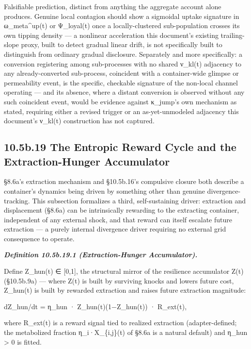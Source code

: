 \documentclass[
]{article}
\begin{document}
Falsifiable prediction, distinct from anything the aggregate account
alone produces. Genuine local contagion should show a sigmoidal uptake
signature in ω\_meta\^{}up(t) or Ψ\_loyal(t) once a locally-clustered
sub-population crosses its own tipping density --- a nonlinear
acceleration this document's existing trailing-slope proxy, built to
detect gradual linear drift, is not specifically built to distinguish
from ordinary gradual disclosure. Separately and more specifically: a
conversion registering among sub-processes with no shared ν\_kl(t)
adjacency to any already-converted sub-process, coincident with a
container-wide glimpse or permeability event, is the specific, checkable
signature of the non-local channel operating --- and its absence, where
a distant conversion is observed without any such coincident event,
would be evidence against κ\_jump's own mechanism as stated, requiring
either a revised trigger or an as-yet-unmodeled adjacency this
document's ν\_kl(t) construction has not captured.

\hypertarget{b.19-the-entropic-reward-cycle-and-the-extraction-hunger-accumulator}{%
\subsection{10.5b.19 The Entropic Reward Cycle and the Extraction-Hunger
Accumulator}\label{b.19-the-entropic-reward-cycle-and-the-extraction-hunger-accumulator}}

§8.6a's extraction mechanism and §10.5b.16's compulsive closure both
describe a container's dynamics being driven by something other than
genuine divergence-tracking. This subsection formalizes a third,
self-sustaining driver: extraction and displacement (§8.6a) can be
intrinsically rewarding to the extracting container, independent of any
external shock, and that reward can itself escalate future extraction
--- a purely internal divergence driver requiring no external grid
consequence to operate.

\emph{\textbf{Definition 10.5b.19.1 (Extraction-Hunger Accumulator).}}

Define Z\_hun(t) ∈ {[}0,1{]}, the structural mirror of the resilience
accumulator Z(t) (§10.5b.9a) --- where Z(t) is built by surviving knocks
and lowers future cost, Z\_hun(t) is built by rewarded extraction and
raises future extraction magnitude:

dZ\_hun/dt = η\_hun · Z\_hun(t)(1−Z\_hun(t)) · R\_ext(t),

where R\_ext(t) is a reward signal tied to realized extraction
(adapter-defined; the metabolized fraction η\_i·X\_\{i,j\}(t) of §8.6a
is a natural default) and η\_hun \textgreater{} 0 is fitted.
\end{document}
